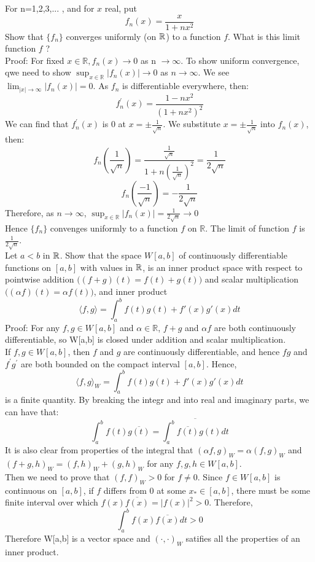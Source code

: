 \documentclass [12pt,letterpaper]{exam}
\begin{document}
\begin{questions}

\question For n=1,2,3,... , and for $x$ real, put 
$$
f_n(x)=\frac{x}{1+nx^2}
$$ 
Show that $\{ f_n \}$ converges uniformly (on $\mathbb{R}$) to a function $f$. What is this limit function $f$ ?\\

Proof: For fixed $x \in \mathbb{R}, f_n(x) \rightarrow 0$ as n $\rightarrow \infty$. To show uniform convergence, qwe need to show $\sup_{x \in \mathbb{R}} |f_n(x)| \rightarrow 0$ as $n \rightarrow \infty$. We see $\lim_{|x| \rightarrow \infty} |f_n(x)| = 0$. As $f_n$ is differentiable everywhere, then:\\
$$f_{n}^{'}(x) = \frac{1-nx^2}{(1+nx^2)^2}$$
We can find that $f_{n}^{'}(x)$ is 0 at $x = \pm \frac{1}{\sqrt{n}}$. We substitute $x = \pm \frac{1}{\sqrt{n}}$ into $f_n(x)$, then:
$$f_n(\frac{1}{\sqrt{n}}) = \frac{\frac{1}{\sqrt{n}}}{1 + n(\frac{1}{\sqrt{n}})^2} = \frac{1}{2\sqrt{n}}$$
$$f_n(\frac{-1}{\sqrt{n}}) = -\frac{1}{2\sqrt{n}}$$
Therefore, as $n \rightarrow \infty$, $\sup_{x \in \mathbb{R}} |f_n(x)| = \frac{1}{2\sqrt{n}} \rightarrow 0$\\
Hence $\big\{ f_n \big\}$ convenges uniformly to a function $f$ on $\mathbb{R}$. The limit of function $f$ is $\frac{1}{2\sqrt{n}}$.\\

\question %
Let $a<b$ in $\mathbb{R}$. Show that the space $W[a,b]$ of continuously differentiable functions on $[a,b]$
with values in $\mathbb{R}$, is an inner product space with respect to pointwise addition $\bigl( (f+g)(t)=f(t)+g(t)\bigr)$ and
scalar multiplication $\bigl( (\alpha f)(t)=\alpha f(t)\bigr)$, and inner product
$$
\langle f,g\rangle = \int_{a}^{b} f(t)g(t)+f'(x)g'(x) dt
$$
Proof: For any $f,g \in W[a,b]$ and $\alpha \in \mathbb{R}$, $f+g$ and $\alpha f$ are both continuously differentiable, so W[a,b] is closed under addition and scalar multiplication. \\
If $f,g \in W[a,b]$, then $f$ and $g$ are continuously differentiable, and hence $f{g}$ and $f^{'}{g^{'}}$ are both bounded on the compact interval $[a,b]$. Hence,
$${\langle f,g\rangle}_W = \int_{a}^{b} f(t)g(t)+f'(x)g'(x) dt$$ is a finite quantity.
By breaking the integr and into real and imaginary parts, we can have that:
$$\int_{a}^{b} f(t)\overline{g(t)} = \overline{\int_{a}^{b} \overline{f(t)}g(t)dt}$$
It is also clear from properties of the integral that $(\alpha f,g)_W = \alpha (f,g)_W$ and $(f + g,h)_W = (f,h)_W + (g,h)_W$ for any $f,g,h \in W[a,b]$.\\
Then we need to prove that $(f,f)_W > 0$ for $f \neq 0$. Since $f \in W[a,b]$ is continuous on $[a,b]$, if $f$ differs from 0 at some $x_{*} \in [a,b]$, there must be some finite interval over which $f(x)\overline{f(x)} = |f(x)|^2 > 0$. Therefore,
$$\int_{a}^{b} f(x)\overline{f(x)} dt > 0$$
Therefore W[a,b] is a vector space and $(\cdot,\cdot)_W$ satifies all the properties of an inner product.\\


\end{questions}
\end{document}
